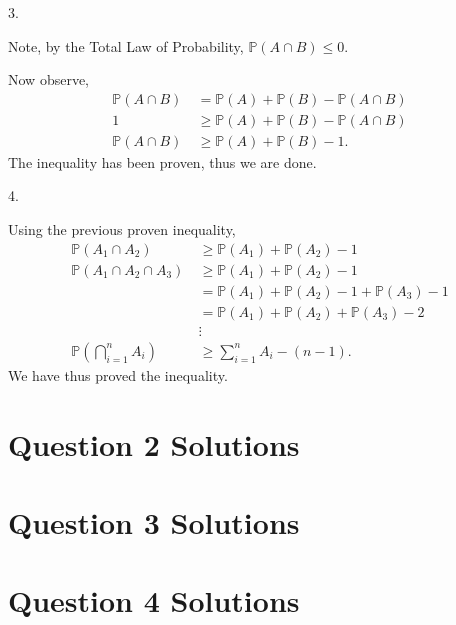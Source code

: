\documentclass{article}
\begin{document}
3.

Note, by the Total Law of Probability, $\mathbb{P}(A\cap B) \leq 0$.

Now observe,
\begin{align*}
    \mathbb{P}(A\cap B) & = \mathbb{P}(A) +\mathbb{P}(B) - \mathbb{P}(A\cap B)\\    
    1 &\geq \mathbb{P}(A) +\mathbb{P}(B) - \mathbb{P}(A\cap B)\\
    \mathbb{P}(A\cap B)\ &\geq \mathbb{P}(A) +\mathbb{P}(B) - 1\mbox{.}
\end{align*}
\hspace*{6mm} The inequality has been proven, thus we are done.

4.

Using the previous proven inequality,
\begin{align*}
    \mathbb{P}(A_1\cap A_2)\ &\geq \mathbb{P}(A_1) + \mathbb{P}(A_2) - 1\\
    \mathbb{P}(A_1\cap A_2\cap A_3)\ &\geq \mathbb{P}(A_1) + \mathbb{P}(A_2) - 1\\
    &= \mathbb{P}(A_1) +\mathbb{P}(A_2) - 1 +  \mathbb{P}(A_3) - 1\\
    &= \mathbb{P}(A_1) +\mathbb{P}(A_2) +  \mathbb{P}(A_3) - 2\\
    &\vdots\\
    \mathbb{P}(\bigcap_{i = 1}^n A_i)\ &\geq \sum_{i = 1}^{n} A_i - (n-1)\mbox{.}
\end{align*}
\hspace*{6mm} We have thus proved the inequality. 

\section*{Question 2 Solutions} %


\section*{Question 3 Solutions} %


\section*{Question 4 Solutions} %
\end{document}
